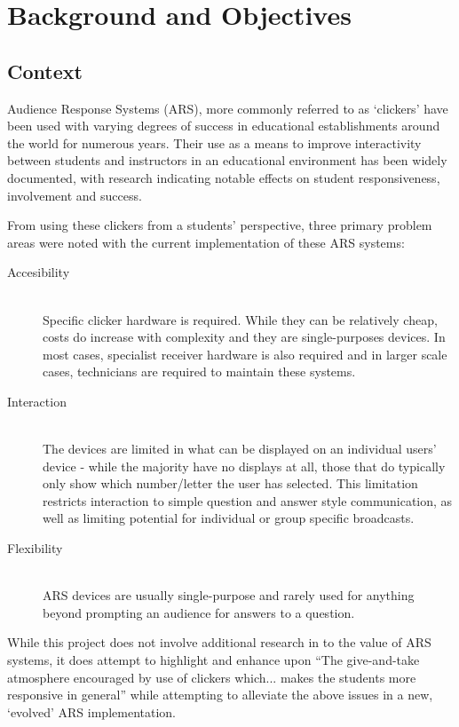 \documentclass[a4papert,11pt,notitlepage]{article}
\begin{document}
\pagebreak

\tableofcontents

\pagebreak

\section{Background and Objectives}
\subsection{Context}
Audience Response Systems (ARS), more commonly referred to as `clickers' have been used with varying degrees of success in educational establishments around the world for numerous years. Their use as a means to improve interactivity between students and instructors in an educational environment has been widely documented, with research indicating notable effects on student responsiveness, involvement and success. 

From using these clickers from a students' perspective, three primary problem areas were noted with the current implementation of these ARS systems:
\begin{description}
\item[Accesibility] \hfill \\
Specific clicker hardware is required. While they can be relatively cheap, costs do increase with complexity and they are single-purposes devices. In most cases, specialist receiver hardware is also required and in larger scale cases, technicians are required to maintain these systems.
\item[Interaction] \hfill \\
The devices are limited in what can be displayed on an individual users' device - while the majority have no displays at all, those that do typically only show which number/letter the user has selected. This limitation restricts interaction to simple question and answer style communication, as well as limiting potential for individual or group specific broadcasts.
\item[Flexibility] \hfill \\
ARS devices are usually single-purpose and rarely used for anything beyond prompting an audience for answers to a question.
\end{description}

While this project does not involve additional research in to the value of ARS systems, it does attempt to highlight and enhance upon ``The give-and-take atmosphere encouraged by use of clickers which... makes the students more responsive in general''\cite{wood:clickers} while attempting to alleviate the above issues in a new, `evolved' ARS implementation.
\end{document}
